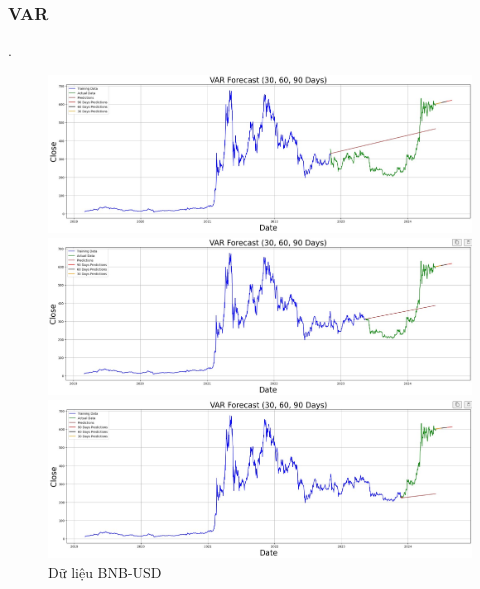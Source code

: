 \documentclass[conference]{IEEEtran}
\begin{document}
\subsubsection{VAR}.

\begin{figure}[H]
    \centering
    \begin{minipage}{0.15\textwidth}
    \centering
    \includegraphics[width=1\textwidth]{Figure/VAR_BNB_7.jpg}
    \end{minipage}
    \hfill
    \begin{minipage}{0.15\textwidth}
    \centering
    \includegraphics[width=1\textwidth]{Figure/VAR_BNB_8.jpg}
    \end{minipage}
    \hfill
    \begin{minipage}{0.15\textwidth}
    \centering
    \includegraphics[width=1\textwidth]{Figure/VAR_BNB_9.jpg}
    \end{minipage}
    \caption{Dữ liệu BNB-USD}
    \label{fig:1}
\end{figure}
\end{document}
